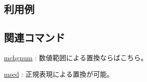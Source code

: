 \subsection*{利用例}

\subsection*{関連コマンド}
\hyperref[sect:mchgnum]{mchgnum} : 数値範囲による置換ならばこちら。

\hyperref[sect:msed]{msed} : 正規表現による置換が可能。

%
